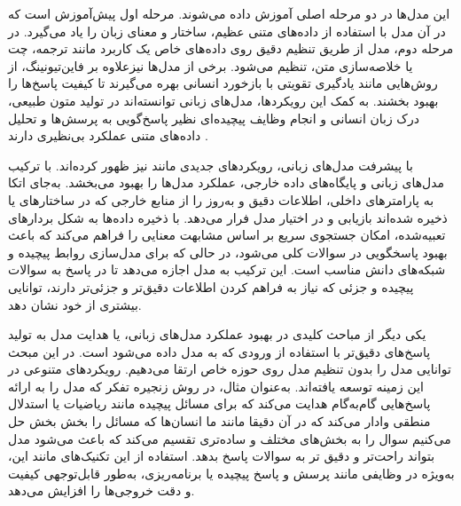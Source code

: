 \documentclass[11pt, a4paper, oneside]{book}
\begin{document}
			این مدل‌ها در دو مرحله اصلی آموزش داده می‌شوند. مرحله اول پیش‌آموزش است که در آن مدل با استفاده از داده‌های متنی عظیم، ساختار و معنای زبان را یاد می‌گیرد. در مرحله دوم، مدل از طریق تنظیم دقیق روی داده‌های خاص یک کاربرد مانند ترجمه، چت یا خلاصه‌سازی متن، تنظیم می‌شود. برخی از مدل‌ها نیزعلاوه بر فاین‌تیونینگ، از روش‌هایی مانند یادگیری تقویتی با بازخورد انسانی بهره می‌گیرند تا کیفیت پاسخ‌ها را بهبود بخشند. به کمک این رویکردها، مدل‌های زبانی توانسته‌اند در تولید متون طبیعی، درک زبان انسانی و انجام وظایف پیچیده‌ای نظیر پاسخ‌گویی به پرسش‌ها و تحلیل داده‌های متنی عملکرد بی‌نظیری دارند .
			
			با پیشرفت مدل‌های زبانی، رویکردهای جدیدی مانند  نیز ظهور کرده‌اند.  با ترکیب مدل‌های زبانی و پایگاه‌های داده خارجی، عملکرد مدل‌ها را بهبود می‌بخشد.\cite{lewis_retrieval-augmented_2021} به‌جای اتکا به پارامترهای داخلی،  اطلاعات دقیق و به‌روز را از منابع خارجی که در ساختارهای  یا  ذخیره شده‌اند بازیابی و در اختیار مدل فرار می‌دهد.  با ذخیره داده‌ها به شکل بردارهای تعبیه‌شده، امکان جستجوی سریع بر اساس مشابهت معنایی را فراهم می‌کند که باعث بهبود پاسخگویی در سوالات کلی می‌شود، در حالی که  برای مدل‌سازی روابط پیچیده و شبکه‌های دانش مناسب است. این ترکیب به مدل اجازه می‌دهد تا در پاسخ به سوالات پیچیده و جزئی که نیاز به فراهم کردن اطلاعات دقیق‌تر و جزئی‌تر دارند، توانایی بیشتری از خود نشان دهد. \cite{edge_local_2024} \cite{guo_lightrag_2024}
			
			یکی دیگر از مباحث کلیدی در بهبود عملکرد مدل‌های زبانی،  یا هدایت مدل به تولید پاسخ‌های دقیق‌تر با استفاده از ورودی که به مدل داده می‌شود است. در این مبحث توانایی مدل را بدون تنظیم مدل روی حوزه خاص ارتقا می‌دهیم. \cite{brown_language_2020}
			رویکردهای متنوعی در این زمینه توسعه یافته‌اند. به‌عنوان مثال، در روش زنجیره تفکر که مدل را به ارائه پاسخ‌هایی گام‌به‌گام هدایت می‌کند که برای مسائل پیچیده مانند ریاضیات یا استدلال منطقی وادار می‌کند که در آن دقیقا مانند ما انسان‌ها که مسائل را بخش بخش حل می‌کنیم سوال را به بخش‌های مختلف و ساده‌تری تقسیم می‌کند که باعث می‌شود مدل بتواند راحت‌تر و دقیق تر به سوالات پاسخ بدهد. استفاده از این تکنیک‌های مانند این، به‌ویژه در وظایفی مانند پرسش و پاسخ پیچیده یا برنامه‌ریزی، به‌طور قابل‌توجهی کیفیت و دقت خروجی‌ها را افزایش می‌دهد. \cite{wang_prompt_2024} \cite{wei_chain--thought_2023}
			
\end{document}
